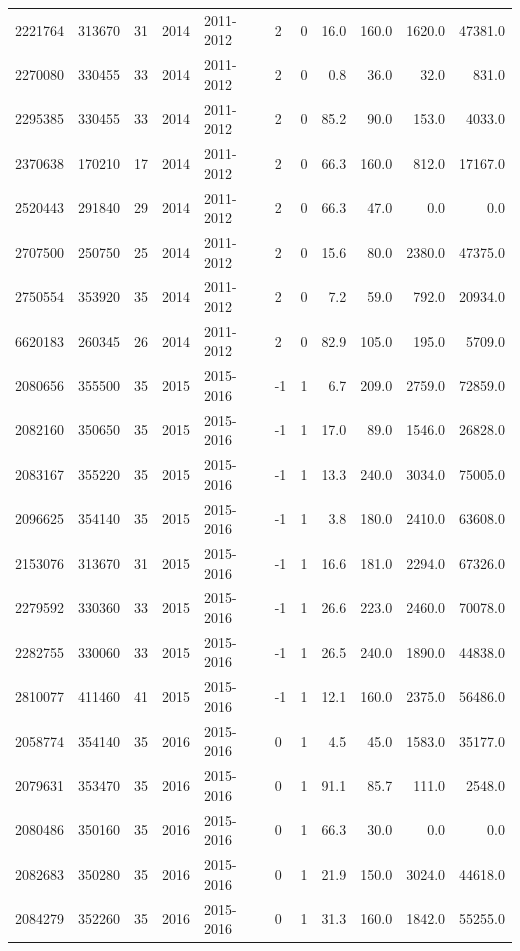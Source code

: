 \begin{table}[p]
\begin{tabular}{llllllrrrrr}
2221764 & 313670 & 31 & 2014 & 2011-2012 & 2 & 0 & 16.0 & 160.0 & 1620.0 & 47381.0 \\
2270080 & 330455 & 33 & 2014 & 2011-2012 & 2 & 0 & 0.8 & 36.0 & 32.0 & 831.0 \\
2295385 & 330455 & 33 & 2014 & 2011-2012 & 2 & 0 & 85.2 & 90.0 & 153.0 & 4033.0 \\
2370638 & 170210 & 17 & 2014 & 2011-2012 & 2 & 0 & 66.3 & 160.0 & 812.0 & 17167.0 \\
2520443 & 291840 & 29 & 2014 & 2011-2012 & 2 & 0 & 66.3 & 47.0 & 0.0 & 0.0 \\
2707500 & 250750 & 25 & 2014 & 2011-2012 & 2 & 0 & 15.6 & 80.0 & 2380.0 & 47375.0 \\
2750554 & 353920 & 35 & 2014 & 2011-2012 & 2 & 0 & 7.2 & 59.0 & 792.0 & 20934.0 \\
6620183 & 260345 & 26 & 2014 & 2011-2012 & 2 & 0 & 82.9 & 105.0 & 195.0 & 5709.0 \\
2080656 & 355500 & 35 & 2015 & 2015-2016 & -1 & 1 & 6.7 & 209.0 & 2759.0 & 72859.0 \\
2082160 & 350650 & 35 & 2015 & 2015-2016 & -1 & 1 & 17.0 & 89.0 & 1546.0 & 26828.0 \\
2083167 & 355220 & 35 & 2015 & 2015-2016 & -1 & 1 & 13.3 & 240.0 & 3034.0 & 75005.0 \\
2096625 & 354140 & 35 & 2015 & 2015-2016 & -1 & 1 & 3.8 & 180.0 & 2410.0 & 63608.0 \\
2153076 & 313670 & 31 & 2015 & 2015-2016 & -1 & 1 & 16.6 & 181.0 & 2294.0 & 67326.0 \\
2279592 & 330360 & 33 & 2015 & 2015-2016 & -1 & 1 & 26.6 & 223.0 & 2460.0 & 70078.0 \\
2282755 & 330060 & 33 & 2015 & 2015-2016 & -1 & 1 & 26.5 & 240.0 & 1890.0 & 44838.0 \\
2810077 & 411460 & 41 & 2015 & 2015-2016 & -1 & 1 & 12.1 & 160.0 & 2375.0 & 56486.0 \\
2058774 & 354140 & 35 & 2016 & 2015-2016 & 0 & 1 & 4.5 & 45.0 & 1583.0 & 35177.0 \\
2079631 & 353470 & 35 & 2016 & 2015-2016 & 0 & 1 & 91.1 & 85.7 & 111.0 & 2548.0 \\
2080486 & 350160 & 35 & 2016 & 2015-2016 & 0 & 1 & 66.3 & 30.0 & 0.0 & 0.0 \\
2082683 & 350280 & 35 & 2016 & 2015-2016 & 0 & 1 & 21.9 & 150.0 & 3024.0 & 44618.0 \\
2084279 & 352260 & 35 & 2016 & 2015-2016 & 0 & 1 & 31.3 & 160.0 & 1842.0 & 55255.0 \\

\end{tabular}
\end{table}
